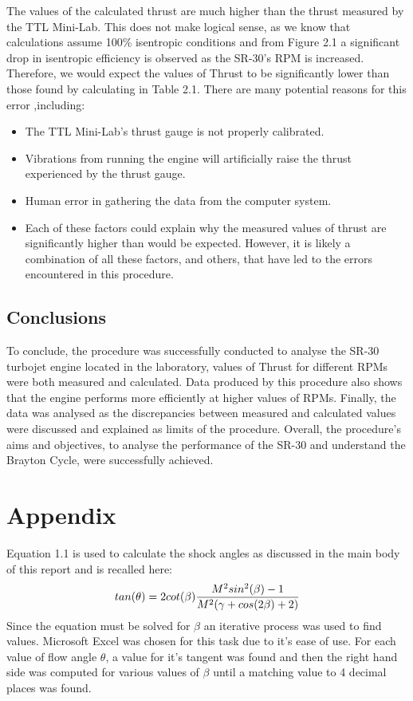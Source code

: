\documentclass[stu, a4paper, 12pt, floatsintext]{apa7}
\numberwithin{figure}{section}
\numberwithin{table}{section}
\numberwithin{equation}{section}
\begin{document}
The values of the calculated thrust are much higher than the thrust measured by the TTL Mini-Lab. This does not make logical sense, as we know that calculations assume 100\% isentropic conditions and from Figure 2.1 a significant drop in isentropic efficiency is observed as the SR-30’s RPM is increased. Therefore, we would expect the values of Thrust to be significantly lower than those found by calculating in Table 2.1. There are many potential reasons for this error ,including: 
\begin{itemize}
    \item The TTL Mini-Lab’s thrust gauge is not properly calibrated. 
    \item Vibrations from running the engine will artificially raise the thrust experienced by the thrust gauge.
    \item Human error in gathering the data from the computer system. 
    \item Each of these factors could explain why the measured values of thrust are significantly higher than would be expected. However, it is likely a combination of all these factors, and others, that have led to the errors encountered in this procedure. 
\end{itemize}

\subsection{Conclusions}
To conclude, the procedure was successfully conducted to analyse the SR-30 turbojet engine located in the laboratory, values of Thrust for different RPMs were both measured and calculated. Data produced by this procedure also shows that the engine performs more efficiently at higher values of RPMs. Finally, the data was analysed as the discrepancies between measured and calculated values were discussed and explained as limits of the procedure. Overall, the procedure's aims and objectives, to analyse the performance of the SR-30 and understand the Brayton Cycle, were successfully achieved.

\newpage
\section{Appendix}
Equation 1.1 is used to calculate the shock angles as discussed in the main body of this report and is recalled here: 
\begin{equation}
    tan(\theta) = 2cot(\beta) {{M^2sin^2(\beta)-1}\over{M^2(\gamma+cos(2\beta)+2)}}
\end{equation}
Since the equation must be solved for $\beta$ an iterative process was used to find values. Microsoft Excel was chosen for this task due to it's ease of use. For each value of flow angle $\theta$, a value for it's tangent was found and then the right hand side was computed for various values of $\beta$ until a matching value to 4 decimal places was found. 

\newpage

\printbibliography
\end{document}
